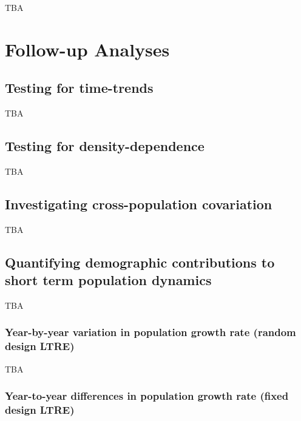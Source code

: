 \documentclass[
]{book}
\begin{document}
TBA

\hypertarget{AddAnalyses}{%
\chapter{Follow-up Analyses}\label{AddAnalyses}}

\hypertarget{testing-for-time-trends}{%
\section{Testing for time-trends}\label{testing-for-time-trends}}

TBA

\hypertarget{testing-for-density-dependence}{%
\section{Testing for density-dependence}\label{testing-for-density-dependence}}

TBA

\hypertarget{investigating-cross-population-covariation}{%
\section{Investigating cross-population covariation}\label{investigating-cross-population-covariation}}

TBA

\hypertarget{quantifying-demographic-contributions-to-short-term-population-dynamics}{%
\section{Quantifying demographic contributions to short term population dynamics}\label{quantifying-demographic-contributions-to-short-term-population-dynamics}}

TBA

\hypertarget{year-by-year-variation-in-population-growth-rate-random-design-ltre}{%
\subsection{Year-by-year variation in population growth rate (random design LTRE)}\label{year-by-year-variation-in-population-growth-rate-random-design-ltre}}

TBA

\hypertarget{year-to-year-differences-in-population-growth-rate-fixed-design-ltre}{%
\subsection{Year-to-year differences in population growth rate (fixed design LTRE)}\label{year-to-year-differences-in-population-growth-rate-fixed-design-ltre}}
\end{document}
